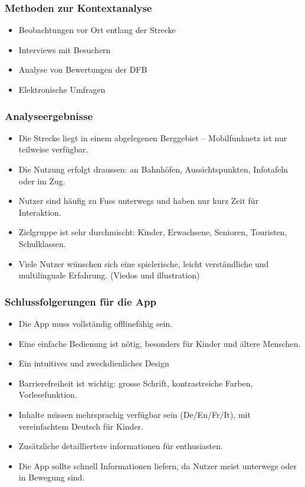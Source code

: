 \documentclass[10pt]{article}
\begin{document}
\subsubsection{Methoden zur Kontextanalyse}

\begin{itemize}
	\item Beobachtungen vor Ort entlang der Strecke
	\item Interviews mit Besuchern
	\item Analyse von Bewertungen der DFB
	\item Elektronische Umfragen
\end{itemize}

\subsubsection{Analyseergebnisse}
\begin{itemize}
	\item Die Strecke liegt in einem abgelegenen Berggebiet – Mobilfunknetz ist nur teilweise verfügbar.
	\item Die Nutzung erfolgt draussen: an Bahnhöfen, Aussichtspunkten, Infotafeln oder im Zug.
	\item Nutzer sind häufig zu Fuss unterwegs und haben nur kurz Zeit für Interaktion.
	\item Zielgruppe ist sehr durchmischt: Kinder, Erwachsene, Senioren, Touristen, Schulklassen.
	\item Viele Nutzer wünschen sich eine spielerische, leicht verständliche und multilinguale Erfahrung. (Viedos und illustration)
\end{itemize}

\subsubsection{Schlussfolgerungen für die App}
\begin{itemize}
	\item Die App muss vollständig offlinefähig sein.
	\item Eine einfache Bedienung ist nötig, besonders für Kinder und ältere Menschen.
	\item Ein intuitives und zweckdienliches Design
	\item Barrierefreiheit ist wichtig: grosse Schrift, kontrastreiche Farben, Vorlesefunktion.
	\item Inhalte müssen mehrsprachig verfügbar sein (De/En/Fr/It), mit vereinfachtem Deutsch für Kinder.
	\item Zusätzliche detailliertere informationen für enthusiasten.
	\item Die App sollte schnell Informationen liefern, da Nutzer meist unterwegs oder in Bewegung sind.
\end{itemize}
\pagebreak
\end{document}
